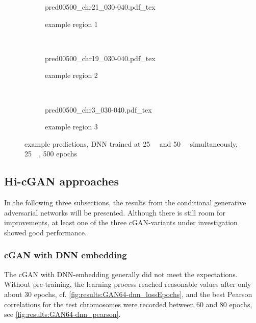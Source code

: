 \begin{figure}[p] %
    \begin{subfigure}{\textwidth}
        \centering
        \scriptsize
        {pred00500_chr21_030-040.pdf_tex}
        \caption{example  region 1} \label{fig:results:25plus50_r1}
    \end{subfigure}\\[6mm]
    \begin{subfigure}{\textwidth}
        \centering
        \scriptsize
        {pred00500_chr19_030-040.pdf_tex}
        \caption{example region 2} \label{fig:results:25plus50_r2}
    \end{subfigure}\\[6mm]
    \begin{subfigure}{\textwidth}
        \centering
        \scriptsize
        {pred00500_chr3_030-040.pdf_tex}
        \caption{example region 3} \label{fig:results:25plus50_r3}
    \end{subfigure}
    \caption{example predictions,  DNN trained at \SI{25}{\kilo\bp} and \SI{50}{\kilo\bp} simultaneously, \SI{25}{\kilo\bp}, 500 epochs}\label{fig:results:25plus50_matrices}
\end{figure}

\clearpage
\subsection{Hi-cGAN approaches} \label{sec:results:cgan}
In the following three subsections, the results from the conditional generative adversarial networks will be presented.
Although there is still room for improvements, at least one of the three cGAN-variants under investigation showed good performance. 

\subsubsection{cGAN with DNN embedding} \label{sec:results:cgan_dnn}
The cGAN with DNN-embedding generally did not meet the expectations.
Without pre-training, the learning process reached reasonable values after only about 30 epochs, cf. \cref{fig:results:GAN64-dnn_lossEpochs},
and the best Pearson correlations for the test chromosomes were recorded between 60 and 80 epochs, see \cref{fig:results:GAN64-dnn_pearson}.


